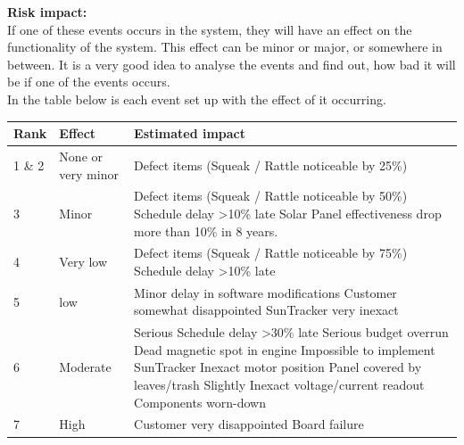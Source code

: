 \documentclass[12pt,a4paper]{report}
\begin{document}
\textbf{Risk impact:}\\

If one of these events occurs in the system, they will have an effect on the functionality of the system. This effect can be minor or major, or somewhere in between. It is a very good idea to analyse the events and find out, how bad it will be if one of the events occurs.\\
In the table below is each event set up with the effect of it occurring.

\noindent \begin{tabular}{|l|p{4cm}|p{10cm}|}
\hline Rank  & Effect & Estimated impact \\ 

\hline 1 \& 2 & None or very minor & Defect items (Squeak / Rattle noticeable by 25\%) \\ 

\hline 3 & Minor & Defect items (Squeak / Rattle noticeable by 50\%)\newline
Schedule delay \textgreater 10\% late\newline
Solar Panel effectiveness drop more than 10\% in 8 years.\newline
 \\ 

\hline 4 & Very low & Defect items (Squeak / Rattle noticeable by 75\%)\newline
Schedule delay \textgreater 10\% late \\ 

\hline 5 & low & Minor delay in software modifications\newline
Customer somewhat disappointed\newline
SunTracker very inexact \\ 

\hline 6 & Moderate & Serious Schedule delay \textgreater 30\% late\newline
Serious budget overrun\newline
Dead magnetic spot in engine\newline
Impossible to implement SunTracker\newline
Inexact motor position\newline
Panel covered by leaves/trash\newline
Slightly Inexact voltage/current readout\newline
Components worn-down \\ 

\hline 7 & High & Customer very disappointed\newline
Board failure \\ 


\end{tabular}
\end{document}
